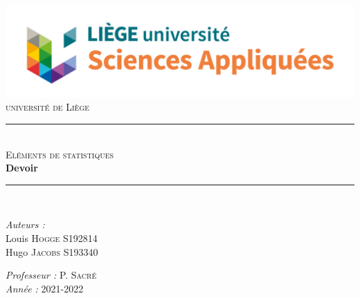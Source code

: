 \documentclass[a4paper, 11pt]{article}
\newcommand{\HRule}{\rule{\linewidth}{0.5mm}}
\begin{document}
\begin{titlepage}


\begin{center}
\includegraphics[scale = 0.35]{logo.jpg}\\
\vspace{1cm}
\textsc{\huge université de Liège}\\[1.2cm]
\HRule \\[1cm]
\textsc{\LARGE Eléments de statistiques}\\[1cm]
{\Huge \bfseries Devoir}\\[1.4cm] 
\HRule \\[1cm]
    
\end{center}

\begin{minipage}{0.4\textwidth}
      \begin{flushleft} \large
        \emph{Auteurs : } \\
        Louis \textsc{Hogge} S192814\\
        Hugo \textsc{Jacobs} S193340\\
     
      \end{flushleft}
\end{minipage}
\begin{minipage}{0.45\textwidth}
      \begin{flushright} \large
        \emph{Professeur : } P. \textsc{Sacré}\\
        \emph{Année : } 2021-2022
      \end{flushright}
\end{minipage}
\end{titlepage}
\end{document}
